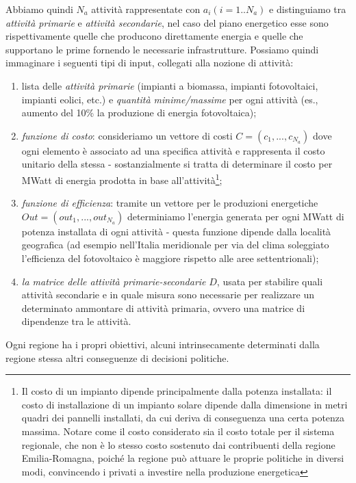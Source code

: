 \documentclass[12pt,a4paper,openright,twoside]{report}
\begin{document}
Abbiamo quindi $N_a$ attività rappresentate con $a_i (i=1..N_a)$ e distinguiamo tra \emph{attività primarie} e \emph{attività secondarie}, nel caso del piano energetico esse sono rispettivamente quelle che producono direttamente energia e quelle che supportano le prime fornendo le necessarie infrastrutture. Possiamo quindi immaginare i seguenti tipi di input, collegati alla nozione di attività:
\begin{enumerate}
\item lista delle \emph{attività primarie} (impianti a biomassa, impianti fotovoltaici, impianti eolici, etc.) e \emph{quantità minime/massime} per ogni attività (es., aumento del 10\% la produzione di energia fotovoltaica);
\item \emph{funzione di costo}: consideriamo un vettore di costi $C=(c_1,...,c_{N_a})$ dove ogni elemento è associato ad una specifica attività e rappresenta il costo unitario della stessa - sostanzialmente si tratta di determinare il costo per MWatt di energia prodotta in base all'attività\footnote{Il costo di un impianto dipende principalmente dalla potenza installata: il costo di installazione di un impianto solare dipende dalla dimensione in metri quadri dei pannelli installati, da cui deriva di conseguenza una certa potenza massima. Notare come il costo considerato sia il costo totale per il sistema regionale, che non è lo stesso costo sostenuto dai contribuenti della regione Emilia-Romagna, poiché la regione può attuare le proprie politiche in diversi modi, convincendo i privati a investire nella produzione energetica};
\item \emph{funzione di efficienza}: tramite un vettore per le produzioni energetiche $Out=(out_1,...,out_{N_a})$ determiniamo l'energia generata per ogni MWatt di potenza installata di ogni attività - questa funzione dipende dalla località geografica (ad esempio nell'Italia meridionale per via del clima soleggiato l'efficienza del fotovoltaico è maggiore rispetto alle aree settentrionali); 
\item \emph{la matrice delle attività primarie-secondarie} $D$, usata per stabilire quali attività secondarie e in quale misura sono necessarie per realizzare un determinato ammontare di attività primaria, ovvero una matrice di dipendenze tra le attività. 

\end{enumerate}
Ogni regione ha i propri obiettivi, alcuni intrinsecamente determinati dalla regione stessa altri conseguenze di decisioni politiche.
\end{document}
